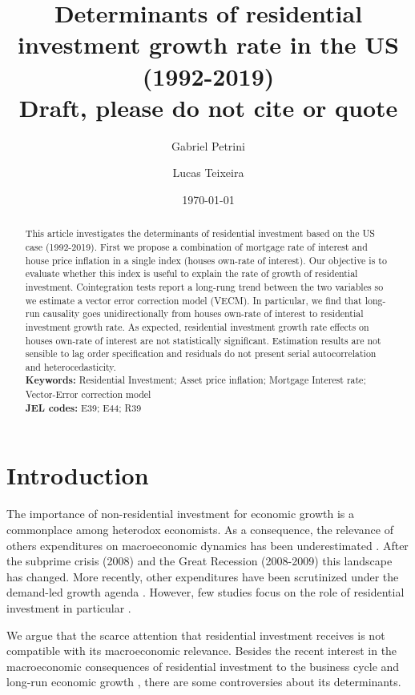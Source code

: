 \documentclass[12pt, a4paper]{article}
\author[1]{Gabriel Petrini}
\affil[1]{PhD Student at University of Campinas (Brazil), Email: \url{gpetrinidasilveira@gmail.com}} %
\author[2]{Lucas Teixeira}
\affil[2]{Assistant Professor at University of Campinas (Brazil), Email: \url{lucastei@unicamp.br}} %
\date{\today}
\title{Determinants of residential investment growth rate in the US (1992-2019)\\\medskip
\large Draft, please do not cite or quote}
\begin{document}
\maketitle



\begin{abstract}
This article investigates the determinants of residential investment based on the US case (1992-2019).
First we propose a combination of mortgage rate of interest and house price inflation in a single index (houses own-rate of interest).
Our objective is to evaluate whether this index is useful to explain the rate of growth of residential investment.
Cointegration tests report a long-rung trend between the two variables so we estimate a vector error correction model (VECM).
In particular, we find that long-run causality goes unidirectionally from houses own-rate of interest to residential investment growth rate.
As expected, residential investment growth rate effects on houses own-rate of interest are not statistically significant.
Estimation results are not sensible to lag order specification and residuals do not present serial autocorrelation and heterocedasticity.
\\
\noindent \textbf{Keywords:} Residential Investment; Asset price inflation; Mortgage Interest rate; Vector-Error correction model\\
\noindent \textbf{JEL codes:} E39; E44; R39
\end{abstract}


\section{Introduction}
\label{sec:org576dede}
\label{sec:Introduction}
The importance of non-residential investment for economic growth is a commonplace among heterodox economists.
As a consequence, the relevance of others expenditures on macroeconomic dynamics has been underestimated \cite{brochier_macroeconomics_2017}.
After the subprime crisis (2008) and the Great Recession (2008-2009) this landscape has changed.
More recently, other expenditures have been scrutinized under the demand-led growth agenda \cites{freitas_pattern_2013}{girardi_long-run_2016}{girardi_autonomous_2018}{braga_investment_2018}.
However, few studies focus on the role of residential investment in particular \cite{petrini_2021_TD}.

We argue that the scarce attention that residential investment receives is not compatible with its macroeconomic relevance.
Besides the recent interest in the macroeconomic consequences of residential investment to the business cycle and long-run economic growth \cite{fiebiger_trend_2017,fiebiger_semi-autonomous_2018,perez_Montiel_2021}, there are some controversies about its determinants.
\end{document}
